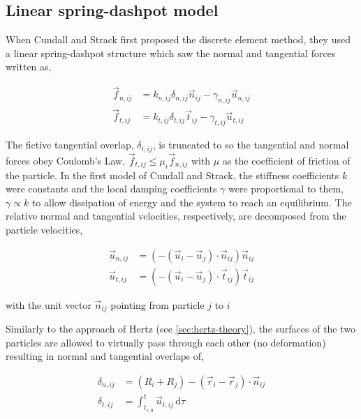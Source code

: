 \subsection{Linear spring-dashpot model}

When Cundall and Strack first proposed the discrete element method, they used a linear spring-dashpot structure which saw the normal and tangential forces written as,

\begin{subequations}
\label{eq:dem-forces}
\begin{align}
	\vec{f}_{n,ij} &= k_{n,ij} \delta_{n,ij}\vec{n}_{ij} - \gamma_{n,ij} \vec{u}_{n,ij} 	\label{eq:normal-force} \\
	\vec{f}_{t,ij} &= k_{t,ij} \delta_{t,ij}\vec{t}_{ij} - \gamma_{t,ij} \vec{u}_{t,ij} 	\label{eq:tangential-force}
\end{align}
\end{subequations}

The fictive tangential overlap, $\delta_{t,ij}$, is truncated to so the tangential and normal forces obey Coulomb's Law, $\vec{f}_{t,ij} \le \mu_i \vec{f}_{n,ij}$ with $\mu$ as the coefficient of friction of the particle. In the first model of Cundall and Strack, the stiffness coefficients $k$ were constants and the local damping coefficients $\gamma$ were proportional to them, $\gamma \propto k$ to allow dissipation of energy and the system to reach an equilibrium. The relative normal and tangential velocities, respectively, are decomposed from the particle velocities,

\begin{subequations}
\label{eq:dem-velocities}
\begin{align}
	\vec{u}_{n,ij} &= (-(\vec{u}_i-\vec{u}_j)\cdot\vec{n}_{ij})\vec{n}_{ij} \\
	\vec{u}_{t,ij} &= (-(\vec{u}_i-\vec{u}_j)\cdot\vec{t}_{ij})\vec{t}_{ij}
\end{align}
\end{subequations}

with the unit vector $\vec{n}_{ij}$ pointing from particle $j$ to $i$

Similarly to the approach of Hertz (see \cref{sec:hertz-theory}), the surfaces of the two particles are allowed to virtually pass through each other (no deformation) resulting in normal and tangential overlaps of,

\begin{subequations}
\label{eq:dem-overlaps}
\begin{align}
	\delta_{n,ij} &= (R_i + R_j) - (\vec{r}_i -\vec{r}_j)\cdot \vec{n}_{ij} \\
	\delta_{t,ij} &= \int_{t_{c,0}}^{t} \vec{u}_{t,ij}\,\mathrm{d}\tau 
\end{align}
\end{subequations}

